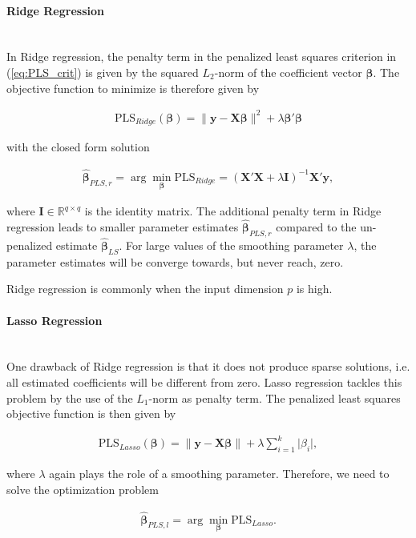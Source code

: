 \documentclass[10pt,a4paper]{article}
\newcommand{\subsubsubsection}[1]{\paragraph{#1}\mbox{}\\}
\begin{document}
\subsubsubsection{Ridge Regression}

In Ridge regression, the penalty term in the penalized least squares criterion in (\ref{eq:PLS_crit}) is given by the squared $L_2$-norm of the coefficient vector $\boldsymbol{\beta}$. The objective function to minimize is therefore given by

\begin{align}
	\text{PLS}_{Ridge}(\boldsymbol{\beta}) = \lVert \boldsymbol{y} - \boldsymbol{X} \boldsymbol{\beta} \rVert^2 + \lambda \boldsymbol{\beta}'\boldsymbol{\beta}
\end{align}

with the closed form solution 

\begin{align}
	\boldsymbol{\hat{\beta}}_{PLS,r} = \arg \min_{\boldsymbol{\beta}} \text{PLS}_{Ridge} = (\boldsymbol{X}'\boldsymbol{X} + \lambda \boldsymbol{I})^{-1}\boldsymbol{X}'\boldsymbol{y},
\end{align}

where $\boldsymbol{I} \in \mathbb R^{q \times q}$ is the identity matrix. The additional penalty term in Ridge regression leads to smaller parameter estimates $\boldsymbol{\hat{\beta}}_{PLS,r}$ compared to the un-penalized estimate $\boldsymbol{\hat{\beta}}_{LS}$. For large values of the smoothing parameter $\lambda$, the parameter estimates will be converge towards, but never reach, zero. 

Ridge regression is commonly when the input dimension $p$ is high. \cite{hoerl1970ridge}

\subsubsubsection{Lasso Regression}

One drawback of Ridge regression is that it does not produce sparse solutions, i.e. all estimated coefficients will be different from zero. Lasso regression tackles this problem by the use of the $L_1$-norm as penalty term. The penalized least squares objective function is then given by

\begin{align}
	\text{PLS}_{Lasso}(\boldsymbol{\beta}) = \lVert \boldsymbol{y} - \boldsymbol{X} \boldsymbol{\beta} \rVert + \lambda \sum_{i=1}^k\vert \beta_i \vert,
\end{align}

where $\lambda$ again plays the role of a smoothing parameter. Therefore, we need to solve the optimization problem

\begin{align} \label{eq:Lasso_OP}
	\boldsymbol{\hat{\beta}}_{PLS,l} = \arg \min_{\boldsymbol{\beta}} \text{PLS}_{Lasso}.
\end{align}
\end{document}
